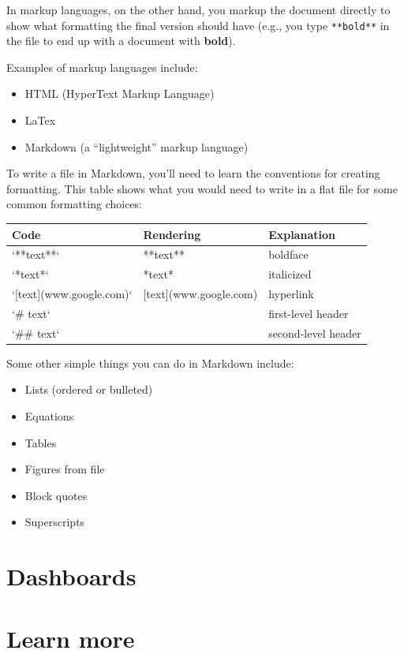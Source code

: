 \documentclass[]{tufte-book}
\providecommand{\tightlist}{%
  \setlength{\itemsep}{0pt}\setlength{\parskip}{0pt}}
\begin{document}
In markup languages, on the other hand, you markup the document directly to show what formatting the final version should have (e.g., you type \texttt{**bold**} in the file to end up with a document with \textbf{bold}).

Examples of markup languages include:

\begin{itemize}
\tightlist
\item
  HTML (HyperText Markup Language)
\item
  LaTex
\item
  Markdown (a ``lightweight'' markup language)
\end{itemize}

To write a file in Markdown, you'll need to learn the conventions for creating formatting. This table shows what you would need to write in a flat file for some common formatting choices:

\begin{tabular}{l|l|l}
\hline
Code & Rendering & Explanation\\
\hline
`**text**` & **text** & boldface\\
\hline
`*text*` & *text* & italicized\\
\hline
`[text](www.google.com)` & [text](www.google.com) & hyperlink\\
\hline
`\# text` &  & first-level header\\
\hline
`\#\# text` &  & second-level header\\
\hline
\end{tabular}

Some other simple things you can do in Markdown include:

\begin{itemize}
\tightlist
\item
  Lists (ordered or bulleted)
\item
  Equations
\item
  Tables
\item
  Figures from file
\item
  Block quotes
\item
  Superscripts
\end{itemize}

\hypertarget{dashboards}{%
\section{Dashboards}\label{dashboards}}

\hypertarget{learn-more-3}{%
\section{Learn more}\label{learn-more-3}}
\end{document}
